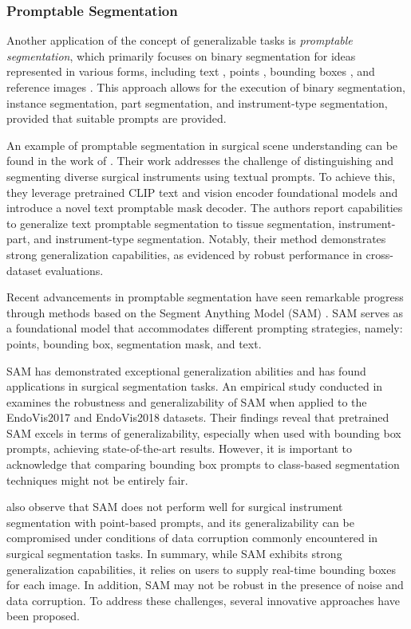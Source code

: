 \subsubsection{Promptable Segmentation}
Another application of the concept of generalizable tasks is \emph{promptable segmentation}, which primarily focuses on binary segmentation for ideas represented in various forms, including text \citep{zhou2023text}, points \citep{kirillov2023segment}, bounding boxes \citep{kirillov2023segment}, and reference images \citep{lueddecke22_cvpr}. This approach allows for the execution of binary segmentation, instance segmentation, part segmentation, and instrument-type segmentation, provided that suitable prompts are provided.


An example of promptable segmentation in surgical scene understanding can be found in the work of \citet{zhou2023text}. Their work addresses the challenge of distinguishing and segmenting diverse surgical instruments using textual prompts. To achieve this, they leverage pretrained CLIP text and vision encoder foundational models and introduce a novel text promptable mask decoder. The authors report capabilities to generalize text promptable segmentation to tissue segmentation, instrument-part, and instrument-type segmentation. Notably, their method demonstrates strong generalization capabilities,  as evidenced by robust performance in cross-dataset evaluations. 


Recent advancements in promptable segmentation have seen remarkable progress through methods based on the Segment Anything Model (SAM) \citep{kirillov2023segment}. SAM serves as a foundational model that accommodates different prompting strategies, namely: points, bounding box, segmentation mask, and text. 

SAM has demonstrated exceptional generalization abilities and has found applications in surgical segmentation tasks. An empirical study conducted in \citet{wang2023sam} examines the robustness and generalizability of SAM when applied to the EndoVis2017 and EndoVis2018 datasets. Their findings reveal that pretrained SAM excels in terms of generalizability, especially when used with bounding box prompts, achieving state-of-the-art results. However, it is important to acknowledge that comparing bounding box prompts to class-based segmentation techniques might not be entirely fair. 

\citet{wang2023sam} also observe that SAM does not perform well for surgical instrument segmentation with point-based prompts, and its generalizability can be compromised under conditions of data corruption commonly encountered in surgical segmentation tasks. In summary, while SAM exhibits strong generalization capabilities, it relies on users to supply real-time bounding boxes for each image. In addition, SAM may not be robust in the presence of noise and data corruption. To address these challenges, several innovative approaches have been proposed.

